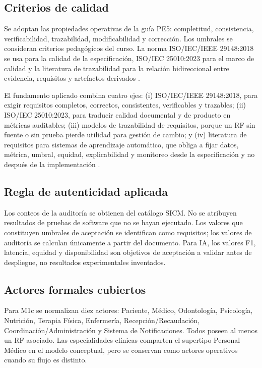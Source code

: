 \documentclass[11pt,a4paper]{article}
\begin{document}
\subsection{Criterios de calidad}
Se adoptan las propiedades operativas de la guía PE5: completitud, consistencia, verificabilidad, trazabilidad, modificabilidad y corrección. Los umbrales se consideran criterios pedagógicos del curso. La norma ISO/IEC/IEEE 29148:2018 se usa para la calidad de la especificación, ISO/IEC 25010:2023 para el marco de calidad y la literatura de trazabilidad para la relación bidireccional entre evidencia, requisitos y artefactos derivados \cite{iso29148,iso25010,gotel1994,ramesh2001}.

El fundamento aplicado combina cuatro ejes: (i) ISO/IEC/IEEE 29148:2018, para exigir requisitos completos, correctos, consistentes, verificables y trazables; (ii) ISO/IEC 25010:2023, para traducir calidad documental y de producto en métricas auditables; (iii) modelos de trazabilidad de requisitos, porque un RF sin fuente o sin prueba pierde utilidad para gestión de cambio; y (iv) literatura de requisitos para sistemas de aprendizaje automático, que obliga a fijar datos, métrica, umbral, equidad, explicabilidad y monitoreo desde la especificación y no después de la implementación \cite{pohl,swebok,vogelsang2019,ahmad2023,habibullah2023}.

\subsection{Regla de autenticidad aplicada}
Los conteos de la auditoría se obtienen del catálogo SICM. No se atribuyen resultados de pruebas de software que no se hayan ejecutado. Los valores que constituyen umbrales de aceptación se identifican como requisitos; los valores de auditoría se calculan únicamente a partir del documento. Para IA, los valores F1, latencia, equidad y disponibilidad son objetivos de aceptación a validar antes de despliegue, no resultados experimentales inventados.

\subsection{Actores formales cubiertos}
Para M1c se normalizan diez actores: Paciente, Médico, Odontología, Psicología, Nutrición, Terapia Física, Enfermería, Recepción/Recaudación, Coordinación/Administración y Sistema de Notificaciones. Todos poseen al menos un RF asociado. Las especialidades clínicas comparten el supertipo Personal Médico en el modelo conceptual, pero se conservan como actores operativos cuando su flujo es distinto.
\end{document}
